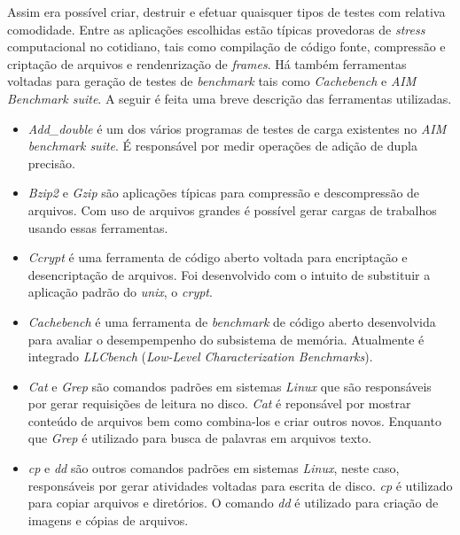 Assim era possível criar, destruir e efetuar quaisquer tipos de testes com relativa comodidade. Entre as aplicações escolhidas estão típicas provedoras de \textit{stress} computacional no cotidiano, tais como compilação de código fonte, compressão e criptação de arquivos e rendenrização de \textit{frames}. Há também ferramentas voltadas para geração de testes de \textit{benchmark} tais como \textit{Cachebench} e \textit{AIM Benchmark suite}. A seguir é feita uma breve descrição das ferramentas utilizadas.

\begin{itemize}
\item \textit{Add\_double} \footnotemark[3]                                                                                                                               é um dos vários programas de testes de carga existentes no \textit{AIM benchmark suite}. É responsável por medir operações de adição de dupla precisão.

\item \textit{Bzip2} \footnotemark[4] e \textit{Gzip} \footnotemark[5] são aplicações típicas para compressão e descompressão de arquivos. Com uso de arquivos grandes é possível gerar cargas de trabalhos usando essas ferramentas.

\item \textit{Ccrypt} \footnotemark[6] é uma ferramenta de código aberto voltada para encriptação e desencriptação de arquivos. Foi desenvolvido com o intuito de substituir a aplicação padrão do \textit{unix}, o \textit{crypt}.

\item \textit{Cachebench} \footnotemark[7] é uma ferramenta de \textit{benchmark} de código aberto desenvolvida para avaliar o desempempenho do subsistema de memória. Atualmente é integrado \textit{LLCbench} (\textit{Low-Level Characterization Benchmarks}).

\item \textit{Cat} e \textit{Grep} são comandos padrões em sistemas \textit{Linux} que são responsáveis por gerar requisições de leitura no disco. \textit{Cat} é reponsável por mostrar conteúdo de arquivos bem como combina-los e criar outros novos. Enquanto que \textit{Grep} é utilizado para busca de palavras em arquivos texto.

\item \textit{cp} e \textit{dd} são outros comandos padrões em sistemas \textit{Linux}, neste caso, responsáveis por gerar atividades voltadas para escrita de disco. \textit{cp} é utilizado para copiar arquivos e diretórios. O comando \textit{dd} é utilizado para criação de imagens e cópias de arquivos.


\end{itemize}
